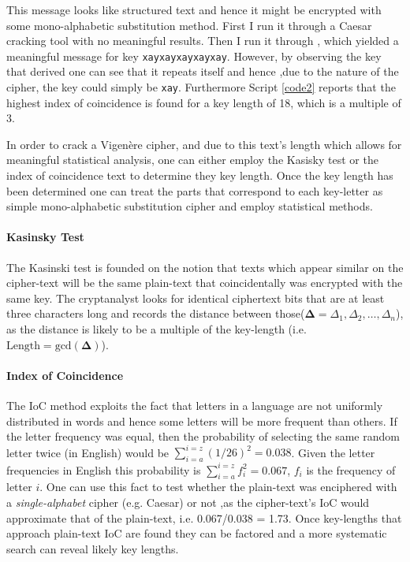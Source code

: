 \documentclass[12pt,a4paper,onecolumn]{article}
\begin{document}
This message looks like structured text and hence it might be encrypted with some mono-alphabetic substitution method. First I run it through a Caesar cracking tool with no meaningful results. Then I run it through \citep{tool:vigenere_cracker}, which yielded a meaningful message for key \texttt{xayxayxayxayxay}. However, by observing the key that \citep{tool:vigenere_cracker} derived one can see that it repeats itself and hence ,due to the nature of the cipher, the key could simply be \texttt{xay}. Furthermore Script \ref{code2} reports that the highest index of coincidence is found for a key length of 18, which is a multiple of 3.

In order to crack a Vigenère cipher, and due to this text's length which allows for meaningful statistical analysis, one can either employ the Kasisky test or the index of coincidence text to determine they key length. Once the key length has been determined one can treat the parts that correspond to each key-letter as simple mono-alphabetic substitution cipher and employ statistical methods.

\paragraph{Kasinsky Test} The Kasinski test is founded on the notion that texts which appear similar on the cipher-text will be the same plain-text that coincidentally was encrypted with the same key. The cryptanalyst looks for identical ciphertext bits that are at least three characters long and records the distance between those($\mathbf{\Delta} = {\Delta _1, \Delta _2, \dots , \Delta _n}$), as the distance is likely to be a multiple of the key-length (i.e. $\text{Length} = \text{gcd}(\mathbf{\Delta})$).

\paragraph{Index of Coincidence} The IoC method exploits the fact that letters in a language are not uniformly distributed in words and hence some letters will be more frequent than others. If the letter frequency was equal, then the probability of selecting the same random letter twice (in English) would be $\sum_{i=a}^{i=z}(1/26)^2 = 0.038$. Given the letter frequencies in English this probability is $\sum_{i=a}^{i=z}f_i ^2 = 0.067$, $f_i$ is the frequency of letter $i$. One can use this fact to test whether the plain-text was enciphered with a \textit{single-alphabet} cipher (e.g. Caesar) or not ,as the cipher-text's IoC would approximate that of the plain-text, i.e. 0.067/0.038 = 1.73. Once key-lengths that approach plain-text IoC are found they can be factored and a more systematic search can reveal likely key lengths.
\end{document}
